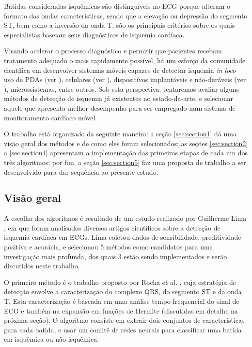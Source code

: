 Batidas consideradas isquêmicas são distinguíveis no ECG porque alteram o formato das ondas características, sendo que a elevação ou depressão do segmento ST, bem como a inversão da onda T, são os principais critérios sobre os quais especialistas baseiam seus diagnósticos de isquemia cardíaca.

Visando acelerar o processo diagnóstico e permitir que pacientes recebam tratamento adequado o mais rapidamente possível, há um esforço da comunidade científica em desenvolver sistemas móveis capazes de detectar isquemia \emph{in loco} -- uso de PDAs (ver \cite{Couceiro08}), celulares (ver \cite{Varella11}), dispositívos implantáveis e não-duráveis (ver \cite{Rocha10}), microssistemas, entre outros. Sob esta perspectiva, tentaremos avaliar alguns métodos de detecção de isquemia já existentes no estado-da-arte, e selecionar aquele que apresenta melhor desempenho para ser empregado num sistema de monitoramento cardíaco móvel.

O trabalho está organizado da seguinte maneira: a seção \ref{sec:section1} dá uma visão geral dos métodos e de como eles foram selecionados; as seções \ref{sec:section2} a \ref{sec:section4} apresentam a implementação das primeiras etapas de cada um dos três algoritmos; por fim, a seção \ref{sec:section5} faz uma proposta de trabalho a ser desenvolvido para dar sequência ao presente estudo.

\subsection{Visão geral}

A escolha dos algoritmos é resultado de um estudo realizado por Guilherme Lima \cite{Lima01}, em que foram analisados diversos artigos científicos sobre a detecção de isquemia cardíaca em ECGs. Lima coletou dados de sensibilidade, preditividade positiva e acurácia, e selecionou 5 métodos como candidatos para uma investigação mais profunda, dos quais 3 estão sendo implementados e serão discutidos neste trabalho.

O primeiro método é o trabalho proposto por Rocha et al. \cite{Rocha10}, cuja estratégia de detecção envolve a caracterização do complexo QRS, do segmento ST e da onda T. Esta caracterização é baseada em uma análise tempo-frequencial do sinal de ECG e também na expansão em funções de Hermite (discutidas em detalhe na próxima seção). O algoritmo consiste em extrair dois conjuntos de características para cada batida, e usar um comitê de redes neurais para classificar uma batida em isquêmica ou não-isquêmica.

